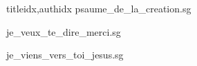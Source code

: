 \documentclass[
    ]{article}
\begin{document}
\begin{songs}{titleidx,authidx}
{psaume_de_la_creation.sg}


{je_veux_te_dire_merci.sg}


{je_viens_vers_toi_jesus.sg}

\end{songs}
\end{document}
